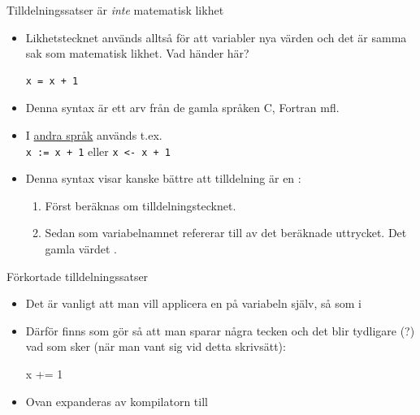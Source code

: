 \begin{Slide}{Tilldelningssatser är \emph{inte} matematisk likhet}\SlideFontSmall

\begin{itemize}

\item Likhetstecknet används alltså för att  variabler nya värden och det är  samma sak som matematisk likhet. Vad händer här?
\begin{lstlisting}
x = x + 1
\end{lstlisting}

\item Denna syntax är ett arv från de gamla språken C, Fortran mfl.

\item I \href{https://en.wikipedia.org/wiki/Assignment_\%28computer_science\%29}{andra språk} används  t.ex.  \\\vspace{1em}
\texttt{x := x + 1}  \hspace{2em} eller  \hspace{2em} \texttt{x <- x + 1} \\\vspace{0.5em}

\item Denna syntax visar kanske bättre att tilldelning är en :

\begin{enumerate}\SlideFontTiny
\item Först beräknas  om tilldelningstecknet.
\item Sedan  som variabelnamnet refererar till av det beräknade uttrycket. Det gamla värdet .
\end{enumerate}

\end{itemize}

\end{Slide}


\begin{Slide}{Förkortade tilldelningssatser}
\begin{itemize}
\item Det är vanligt att man vill applicera en  på variabeln själv, så som i \\

\item Därför finns  som gör så att man sparar några tecken och det blir tydligare (?) vad som sker (när man vant sig vid detta skrivsätt):
\begin{Code}
x += 1
\end{Code}

\item Ovan expanderas av kompilatorn till 
\end{itemize}


\end{Slide}


